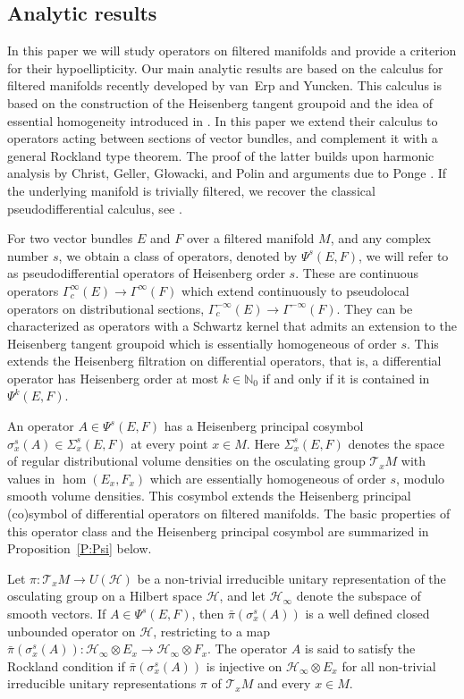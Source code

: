 \documentclass[reqno,12pt]{amsart}
\newcommand\N{\mathbb N}
\theoremstyle{plain}
\theoremstyle{definition}
\begin{document}
\subsection{Analytic results} 



In this paper we will study operators on filtered manifolds and provide a criterion for their hypoellipticity.
Our main analytic results are based on the calculus for filtered manifolds recently developed by van~Erp and Yuncken.
This calculus is based on the construction of the Heisenberg tangent groupoid \cite{EY15,EY16,CP15} and the idea of essential homogeneity introduced in \cite{DS14}.
In this paper we extend their calculus to operators acting between sections of vector bundles, and complement it with a general Rockland type theorem.
The proof of the latter builds upon harmonic analysis by Christ, Geller, G{\l}owacki, and Polin \cite{CGGP92} and arguments due to Ponge \cite{P08}.
If the underlying manifold is trivially filtered, we recover the classical pseudodifferential calculus, see \cite{DS14}.


For two vector bundles $E$ and $F$ over a filtered manifold $M$, and any complex number $s$, we obtain a class of operators, denoted by $\Psi^s(E,F)$, we will refer to as pseudodifferential operators of Heisenberg order $s$.
These are continuous operators $\Gamma^\infty_c(E)\to\Gamma^\infty(F)$ which extend continuously to pseudolocal operators on distributional sections, $\Gamma^{-\infty}_c(E)\to\Gamma^{-\infty}(F)$.
They can be characterized as operators with a Schwartz kernel that admits an extension to the Heisenberg tangent groupoid which is essentially homogeneous of order $s$.
This extends the Heisenberg filtration on differential operators, that is, a differential operator has Heisenberg order at most $k\in\N_0$ if and only if it is contained in $\Psi^k(E,F)$.


An operator $A\in\Psi^s(E,F)$ has a Heisenberg principal cosymbol $\sigma_x^s(A)\in\Sigma^s_x(E,F)$ at every point $x\in M$.
Here $\Sigma^s_x(E,F)$ denotes the space of regular distributional volume densities on the osculating group $\mathcal T_xM$ with values in $\hom(E_x,F_x)$ which are essentially homogeneous of order $s$, modulo smooth volume densities.
This cosymbol extends the Heisenberg principal (co)symbol of differential operators on filtered manifolds.
The basic properties of this operator class and the Heisenberg principal cosymbol are summarized in Proposition~\ref{P:Psi} below.


Let $\pi\colon\mathcal T_xM\to U(\mathcal H)$ be a non-trivial irreducible unitary representation of the osculating group on a Hilbert space $\mathcal H$, and let $\mathcal H_\infty$ denote the subspace of smooth vectors.
If $A\in\Psi^s(E,F)$, then $\bar\pi(\sigma_x^s(A))$ is a well defined closed unbounded operator on $\mathcal H$, restricting to a map $\bar\pi(\sigma^s_x(A))\colon\mathcal H_\infty\otimes E_x\to\mathcal H_\infty\otimes F_x$.
The operator $A$ is said to satisfy the Rockland condition if $\bar\pi(\sigma^s_x(A))$ is injective on $\mathcal H_\infty\otimes E_x$ for all non-trivial irreducible unitary representations $\pi$ of $\mathcal T_xM$ and every $x\in M$.
\end{document}
